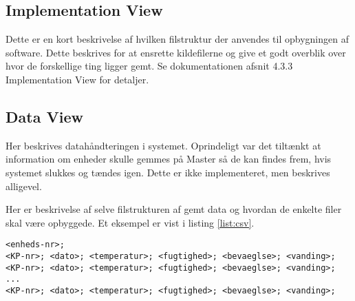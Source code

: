
\subsection{Implementation View}
Dette er en kort beskrivelse af hvilken filstruktur der anvendes til opbygningen af software. Dette beskrives for at ensrette kildefilerne og give et godt overblik over hvor de forskellige ting ligger gemt.
Se dokumentationen afsnit 4.3.3 Implementation View for detaljer.

\subsection{Data View}
Her beskrives datahåndteringen i systemet. Oprindeligt var det tiltænkt at information om enheder skulle gemmes på Master så de kan findes frem, hvis systemet slukkes og tændes igen. Dette er ikke implementeret, men beskrives alligevel.

Her er beskrivelse af selve filstrukturen af gemt data og hvordan de enkelte filer skal være opbyggede. 
Et eksempel er vist i listing \ref{list:csv}.

\begin{lstlisting}[caption=Semikolon-separeret datafil til log af enheder, label={list:csv}]
<enheds-nr>;
<KP-nr>; <dato>; <temperatur>; <fugtighed>; <bevaeglse>; <vanding>;
<KP-nr>; <dato>; <temperatur>; <fugtighed>; <bevaeglse>; <vanding>;
...
<KP-nr>; <dato>; <temperatur>; <fugtighed>; <bevaeglse>; <vanding>;
\end{lstlisting}



